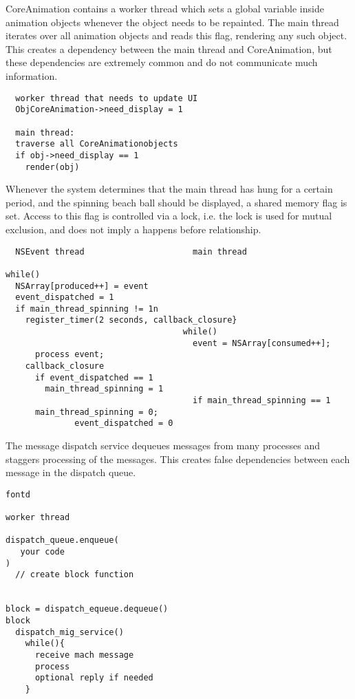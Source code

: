 CoreAnimation contains a worker thread which sets a global variable inside
animation objects whenever the object needs to be repainted. The main thread
iterates over all animation objects and reads this flag, rendering any such
object. This creates a dependency between the main thread and CoreAnimation,
but these dependencies are extremely common and do not communicate much
information.

{\footnotesize \begin{verbatim}
  worker thread that needs to update UI
  ObjCoreAnimation->need_display = 1

  main thread:
  traverse all CoreAnimationobjects
  if obj->need_display == 1
    render(obj)
\end{verbatim}
}

Whenever the system determines that the main thread has hung for a certain period, and the spinning beach ball should be displayed, a shared memory flag is set. Access to this flag is controlled via a lock, i.e. the lock is used for mutual exclusion, and does not imply a happens before relationship.

{\footnotesize \begin{verbatim}
  NSEvent thread                      main thread

while()
  NSArray[produced++] = event
  event_dispatched = 1
  if main_thread_spinning != 1n
    register_timer(2 seconds, callback_closure}
                                    while()
                                      event = NSArray[consumed++];
      process event;
    callback_closure
      if event_dispatched == 1
        main_thread_spinning = 1
                                      if main_thread_spinning == 1
      main_thread_spinning = 0;
              event_dispatched = 0
\end{verbatim}
}

The message dispatch service dequeues messages from many processes and staggers
processing of the messages. This creates false dependencies between each
message in the dispatch queue.
{\footnotesize \begin{verbatim}
fontd

worker thread

dispatch_queue.enqueue(
   your code
)
  // create block function


block = dispatch_equeue.dequeue()
block
  dispatch_mig_service()
    while(){
      receive mach message
      process
      optional reply if needed
    }
\end{verbatim}
}

